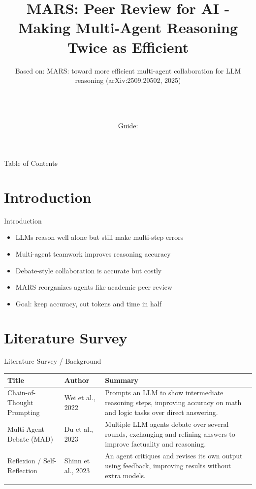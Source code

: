\documentclass[10pt]{beamer}
\title[B.Tech Seminar]{MARS: Peer Review for AI - Making Multi-Agent Reasoning Twice as Efficient}
\subtitle{Based on: MARS: toward more efficient multi-agent collaboration for LLM reasoning (arXiv:2509.20502, 2025)}
\author[\studentname\ (\shortinst)]{\studentname \\ \small \rollno \\ \small \rollclass \\ \small Guide: \guidename}
\institute[]{\deptname \\ \collegename}
\date{\seminardate}
\begin{document}
\begin{frame}[plain]
  \titlepage
\end{frame}

\begin{frame}{Table of Contents}
  \tableofcontents
\end{frame}

\section{Introduction}
\begin{frame}{Introduction}
\begin{itemize}
  \item LLMs reason well alone but still make multi-step errors
  \item Multi-agent teamwork improves reasoning accuracy
  \item Debate-style collaboration is accurate but costly
  \item MARS reorganizes agents like academic peer review
  \item Goal: keep accuracy, cut tokens and time in half
\end{itemize}
\end{frame}

\section{Literature Survey}
\begin{frame}{Literature Survey / Background}
  \small
  \begin{tabular}{@{}p{2.7cm}p{2.3cm}p{5.6cm}@{}}
    \toprule
    \textbf{Title} & \textbf{Author} & \textbf{Summary} \\
    \midrule
    Chain-of-Thought Prompting & Wei et al., 2022 & Prompts an LLM to show intermediate reasoning steps, improving accuracy on math and logic tasks over direct answering. \\
    \addlinespace
    Multi-Agent Debate (MAD) & Du et al., 2023 & Multiple LLM agents debate over several rounds, exchanging and refining answers to improve factuality and reasoning. \\
    \addlinespace
    Reflexion / Self-Reflection & Shinn et al., 2023 & An agent critiques and revises its own output using feedback, improving results without extra models. \\
    \addlinespace
    \bottomrule
  \end{tabular}
\end{frame}
\end{document}
